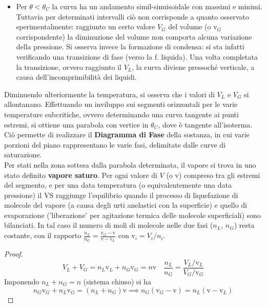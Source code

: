 \documentclass[10pt, oneside]{book}
\newcommand{\molvol}{\mathrm{v}}
\begin{document}
\begin{itemize}[label=$\square$]
\begin{proof}
Viceversa è anche possibile ricavare le costanti di Van der Waals dalla \textbf{curva critica} secondo:
\[a = \frac{9}{8} R \theta_C \molvol_C \hfill b = \frac{\molvol_C}{3}\]
\end{proof}
\item Per $\theta < \theta_C$ la curva ha un andamento simil-sinuisoidale con massimi e minimi. Tuttavia per determinati intervalli ciò non corrisponde a quanto osservato sperimentalmente: raggiunto un certo valore $V_G$ del volume (o $\molvol_G$ corrispondente) la diminuzione del volume non comporta alcuna variazione della pressione. Si osserva invece la formazione di condensa: si sta infatti verificando una transizione di fase (verso la f. liquida). Una volta completata la transizione, ovvero raggiunto il $V_L$, la curva diviene pressoché verticale, a causa dell'incomprimibilità dei liquidi.
\end{itemize}
Diminuendo ulteriormente la temperatura, si osserva che i valori di $V_L$ e $V_G$ si allontanano. Effettuando un inviluppo sui segmenti orizzontali per le varie temperature subcritiche, ovvero determinando una curva tangente ai punti estremi, si ottiene una parabola con vertice in $\theta_C$, dove è tangente all'isoterma.
\\Ciò permette di realizzare il \textbf{Diagramma di Fase} della sostanza, in cui varie porzioni del piano rappresentano le varie fasi, delimitate dalle curve di saturazione.
\\Per stati nella zona sottesa dalla parabola determinata, il vapore si trova in uno stato definito \textbf{vapore saturo}. Per ogni valore di $V$ (o $\molvol$) compreso tra gli estremi del segmento, e per una data temperatura (o equivalentemente una data pressione) il VS raggiunge l'equilibrio quando il processo di liquefazione di molecole del vapore (a causa degli urti anelastici con la superficie) e quello di evaporazione ('liberazione' per agitazione termica delle molecole superficiali) sono bilanciati. In tal caso il numero di moli di molecole nelle due fasi ($n_L$, $n_G$) resta costante, con il rapporto $\displaystyle \frac{n_L}{n_G} = \frac{\molvol_G - \molvol}{\molvol - \molvol_L}$ con $\molvol_i = V_i \big/ n_i$.
\begin{proof}
\[V_L + V_G = n_L \molvol_L + n_G \molvol_G = n \molvol \quad \frac{n_L}{n_G} = \frac{V_L \big/ \molvol_L}{V_G \big/ \molvol_G}\]
Imponendo $n_L + n_G = n$ (sistema chiuso) si ha
\[n_G \molvol_G + n_L \molvol_G = (n_L + n_G) \molvol \implies n_G(\molvol_G - \molvol) = n_L (\molvol - \molvol_L)\]
\end{proof}
\end{document}
